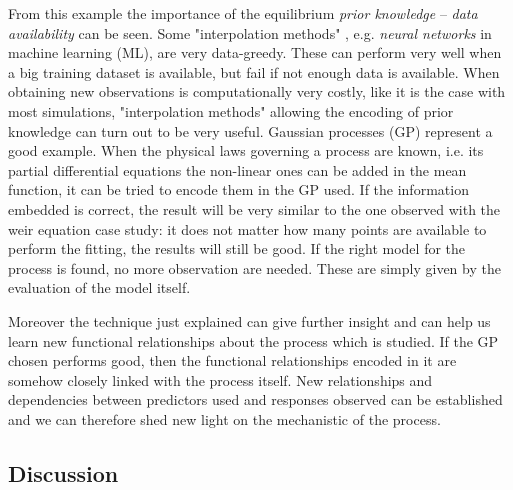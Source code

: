From this example the importance of the equilibrium \emph{prior knowledge} -- \emph{data availability} can be seen.
Some "interpolation methods" , e.g. \emph{neural networks} in machine learning (ML), are very data-greedy.
These can perform very well when a big training dataset is available, but fail if not enough data is available.
When obtaining new observations is computationally very costly, like it is the case with most simulations, "interpolation methods" allowing the encoding of prior knowledge can turn out to be very useful.
Gaussian processes (GP) represent a good example.
When the physical laws governing a process are known, i.e. its partial differential equations  the non-linear ones can be added in the mean function, it can be tried to encode them in the GP used.
If the information embedded is correct, the result will be very similar to the one observed with the weir equation case study: it does not matter how many points are available to perform the fitting, the results will still be good.
If the right model for the process is found, no more observation are needed.
These are simply given by the evaluation of the model itself.

Moreover the technique just explained can give further insight and can help us learn new functional relationships about the process which is studied.
If the GP chosen performs good, then the functional relationships encoded in it are somehow closely linked with the process itself.
New relationships and dependencies between predictors used and responses observed can be established and we can therefore shed new light on the mechanistic of the process.


\subsection{Discussion}




